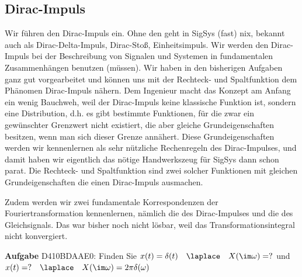 \newpage
\subsection{Dirac-Impuls}
\label{sec:D410BDAAE0}
\begin{Ziel}
Wir führen den Dirac-Impuls ein. Ohne den geht in SigSys (fast) nix, bekannt auch als
Dirac-Delta-Impuls, Dirac-Stoß, Einheitsimpuls.
Wir werden den Dirac-Impuls bei der Beschreibung von Signalen und Systemen
in fundamentalen Zusammenhängen benutzen (müssen).
Wir haben in den bisherigen Aufgaben ganz gut vorgearbeitet und können uns
mit der Rechteck- und Spaltfunktion dem Phänomen Dirac-Impuls nähern.
Dem Ingenieur macht das Konzept am Anfang ein wenig Bauchweh, weil
der Dirac-Impuls keine klassische Funktion ist, sondern eine Distribution, d.h.
es gibt bestimmte Funktionen, für die zwar ein gewünschter Grenzwert nicht existiert,
die aber gleiche Grundeigenschaften besitzen, wenn man sich dieser Grenze annähert.
Diese Grundeigenschaften werden wir kennenlernen als sehr nützliche
Rechenregeln des Dirac-Impulses, und damit haben wir eigentlich das nötige
Handwerkszeug für SigSys dann schon parat.
Die Rechteck- und Spaltfunktion sind zwei solcher Funktionen mit gleichen
Grundeigenschaften die einen Dirac-Impuls ausmachen.

Zudem werden wir zwei fundamentale Korrespondenzen der Fouriertransformation
kennenlernen, nämlich die des Dirac-Impulses und die des Gleichsignals. Das
war bisher noch nicht lösbar, weil das Transformationsintegral nicht konvergiert.
\end{Ziel}
\textbf{Aufgabe} {\tiny D410BDAAE0}:
Finden Sie $x(t)=\delta(t)\quad \laplace \quad X(\im\omega)=?$ und
$x(t)= ? \quad \laplace \quad X(\im\omega)=2\pi \delta(\omega)$
